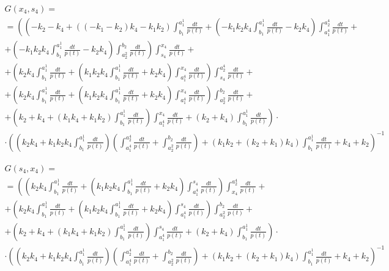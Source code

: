 \documentclass[a4paper,12pt]{article} %
\begin{document}
\begin{multline}
	G(x_4,s_4)=\\=
	\left(
		\left(
			-k_2-k_4+\left( \left( -k_1-k_2\right)  k_4-k_1 k_2\right)  \int_{b_1}^{a_1^1}\frac{dt}{p(t)}+
			\left( -k_1 k_2 k_4 \int_{b_1}^{a_1^1}\frac{dt}{p(t)}-k_2 k_4\right)  \int_{a_1^4}^{a_2^4}\frac{dt}{p(t)}
			\right. \right. + \\ + \left. \left.
			\left( -k_1 k_2 k_4 \int_{b_1}^{a_1^1}\frac{dt}{p(t)}-k_2 k_4\right)  \int_{a_2^2}^{b_2}\frac{dt}{p(t)}
		\right)
		\int_{s_4}^{x_4}\frac{dt}{p(t)}
		\right. + \\ + \left.
		\left( k_2 k_4 \int_{b_1}^{a_1^1}\frac{dt}{p(t)}+\left( k_1 k_2 k_4 \int_{b_1}^{a_1^1}\frac{dt}{p(t)}+
		k_2 k_4\right)  \int_{a_1^4}^{x_4}\frac{dt}{p(t)}\right)  \int_{s_4}^{a_2^4}\frac{dt}{p(t)}
		\right. + \\ + \left.
		\left( k_2 k_4 \int_{b_1}^{a_1^1}\frac{dt}{p(t)}+
		\left( k_1 k_2 k_4 \int_{b_1}^{a_1^1}\frac{dt}{p(t)}+
		k_2 k_4\right)  \int_{a_1^4}^{x_4}\frac{dt}{p(t)}\right)  \int_{a_2^2}^{b_2}\frac{dt}{p(t)}
		\right. + \\ + \left.
		\left( k_2+k_4+\left( k_1 k_4+k_1 k_2\right)  \int_{b_1}^{a_1^1}\frac{dt}{p(t)}\right)  \int_{a_1^4}^{x_4}\frac{dt}{p(t)}+\left( k_2+k_4\right)  \int_{b_1}^{a_1^1}\frac{dt}{p(t)}
	\right) \cdot \\ \cdot \left(
		\left( k_2 k_4+k_1 k_2 k_4 \int_{b_1}^{a_1^1}\frac{dt}{p(t)}\right)
		\left( \int_{a_1^4}^{a_2^4}\frac{dt}{p(t)}+ \int_{a_2^2}^{b_2}\frac{dt}{p(t)} \right)+
		\left( k_1 k_2+\left( k_2+k_1\right)  k_4\right)  \int_{b_1}^{a_1^1}\frac{dt}{p(t)}+k_4+k_2
	\right)^{-1}
\end{multline}

\begin{multline}
	G(s_4,x_4)=\\=
	\left(
		\left( k_2 k_4 \int_{b_1}^{a_1^1}\frac{dt}{p(t)}+
		\left( k_1 k_2 k_4 \int_{b_1}^{a_1^1}\frac{dt}{p(t)}+
		k_2 k_4\right)  \int_{a_1^4}^{s_4}\frac{dt}{p(t)}\right)  \int_{x_4}^{a_2^4}\frac{dt}{p(t)}
		\right. + \\ + \left.
		\left( k_2 k_4 \int_{b_1}^{a_1^1}\frac{dt}{p(t)}+
		\left( k_1 k_2 k_4 \int_{b_1}^{a_1^1}\frac{dt}{p(t)}+
		k_2 k_4\right)  \int_{a_1^4}^{s_4}\frac{dt}{p(t)}\right)  \int_{a_2^2}^{b_2}\frac{dt}{p(t)}
		\right. + \\ + \left.
		\left( k_2+k_4+\left( k_1 k_4+k_1 k_2\right)  \int_{b_1}^{a_1^1}\frac{dt}{p(t)}\right)  \int_{a_1^4}^{s_4}\frac{dt}{p(t)}+\left( k_2+k_4\right)  \int_{b_1}^{a_1^1}\frac{dt}{p(t)}
	\right) \cdot \\ \cdot \left(
		\left( k_2 k_4+k_1 k_2 k_4 \int_{b_1}^{a_1^1}\frac{dt}{p(t)}\right)
		\left( \int_{a_1^4}^{a_2^4}\frac{dt}{p(t)}+ \int_{a_2^2}^{b_2}\frac{dt}{p(t)} \right)+
		\left( k_1 k_2+\left( k_2+k_1\right)  k_4\right)  \int_{b_1}^{a_1^1}\frac{dt}{p(t)}+k_4+k_2
	\right)^{-1}
\end{multline}
\end{document}

